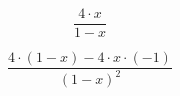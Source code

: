\documentclass[a4paper]{article}
\begin{document}
$$
\frac{4\cdot{x}}{1-{x}}
$$

$$
\frac{4\cdot{\left(1-{x}\right)}-{4\cdot{x}\cdot{\left(-1\right)}}}{\left(1-{x}\right)^{2}}
$$
\end{document}
